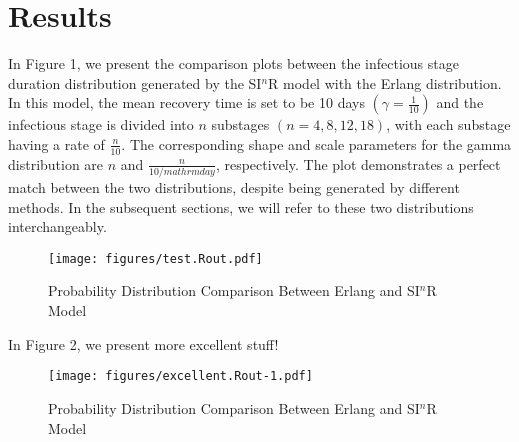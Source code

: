 \documentclass[12pt]{article}
\newcommand{\perday}{\ensuremath{/mathrm{day}}}
\begin{document}
\section{Results}

In Figure 1, we present the comparison plots between the infectious stage duration distribution generated by the SI$^n$R model with the Erlang distribution. In this model, the mean recovery time is set to be 10 days $(\gamma = \frac{1}{10})$ and the infectious stage is divided into $n$ substages $(n = 4, 8, 12, 18)$, with each substage having a rate of $\frac{n}{10}$. The corresponding shape and scale parameters for the gamma distribution are $n$ and $\frac{n}{10\perday}$, respectively. The plot demonstrates a perfect match between the two distributions, despite being generated by different methods. In the subsequent sections, we will refer to these two distributions interchangeably.
\begin{figure}[h]
    \centering
    \texttt{[image: figures/test.Rout.pdf]}
    \caption{Probability Distribution Comparison Between Erlang and SI$^n$R Model}
\end{figure}

In Figure 2, we present more excellent stuff!
\begin{figure}[h]
    \centering
    \texttt{[image: figures/excellent.Rout-1.pdf]}
    \caption{Probability Distribution Comparison Between Erlang and SI$^n$R Model}
\end{figure}


 
\end{document}

